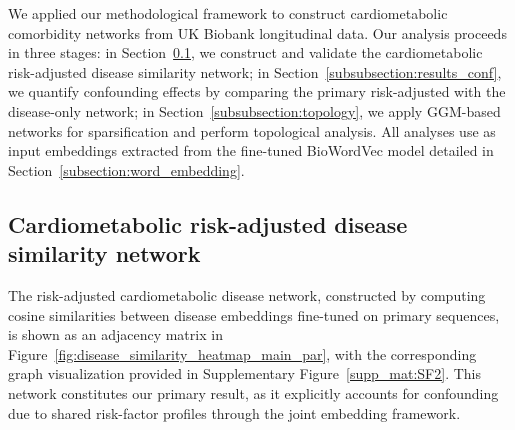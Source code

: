 We applied our methodological framework to construct cardiometabolic comorbidity networks from UK Biobank longitudinal data. Our analysis proceeds in three stages: in Section~\ref{subsubsection:res_cosine}, we construct and validate the cardiometabolic risk-adjusted disease similarity network; in Section~\ref{subsubsection:results_conf}, we quantify confounding effects by comparing the primary risk-adjusted with the disease-only network; in Section~\ref{subsubsection:topology}, we apply GGM-based networks for sparsification and perform topological analysis. All analyses use as input embeddings extracted from the fine-tuned BioWordVec model detailed in Section~\ref{subsection:word_embedding}.

\subsection{Cardiometabolic risk-adjusted disease similarity network}\label{subsubsection:res_cosine}
The risk-adjusted cardiometabolic disease network, constructed by computing cosine similarities between disease embeddings fine-tuned on primary sequences, is shown as an adjacency matrix in Figure~\ref{fig:disease_similarity_heatmap_main_par}, with the corresponding graph visualization provided in Supplementary Figure~\ref{supp_mat:SF2}. This network constitutes our primary result, as it explicitly accounts for confounding due to shared risk-factor profiles through the joint embedding framework.

